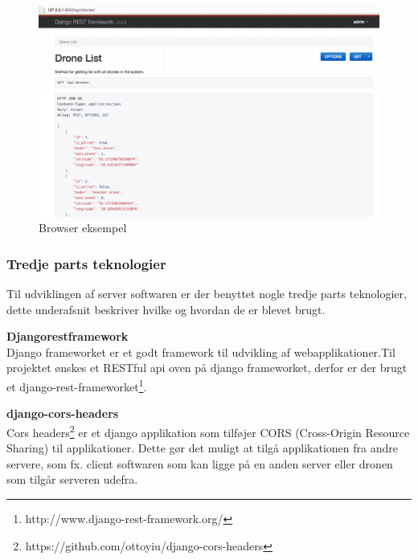 \begin{figure}[H]
	\centering
	\includegraphics[width=1\textwidth]{Billeder/implementation/browser_eksempel.png}
	\caption{Browser eksempel}
	\label{fig:browser_eksempel}
\end{figure}

\vspace{1cm}

\subsubsection*{Tredje parts teknologier}
Til udviklingen af server softwaren er der benyttet nogle tredje parts teknologier, dette underafsnit beskriver hvilke og hvordan de er blevet brugt.

\textbf{Djangorestframework}\\
Django frameworket er et godt framework til udvikling af webapplikationer.Til projektet ønskes et RESTful api oven på django frameworket, derfor er der brugt et django-rest-frameworket\footnote{http://www.django-rest-framework.org/}. 

\textbf{django-cors-headers}\\
Cors headers\footnote{https://github.com/ottoyiu/django-cors-headers} er et django applikation som tilføjer CORS (Cross-Origin Resource Sharing) til applikationer. Dette gør det muligt at tilgå applikationen fra andre servere, som fx.  client softwaren som kan ligge på en anden server eller dronen som tilgår serveren udefra. 

\newpage